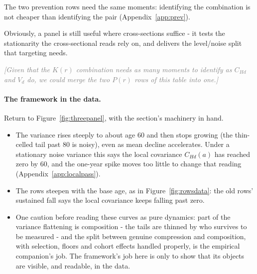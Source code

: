 \documentclass[11pt]{article}
\theoremstyle{remark}
\newcommand{\jnote}[1]{\textcolor{gray}{\textit{[#1]}}}
\newcommand{\Cov}{\mathrm{Cov}}
\begin{document}
The two prevention rows need the same moments: identifying the combination is not cheaper than identifying the pair (Appendix~\ref{app:prev}).

Obviously, a panel is still useful where cross-sections suffice - it tests the stationarity the cross-sectional reads rely on, and delivers the level/noise split that targeting needs.

\jnote{Given that the $K(r)$ combination needs as many moments to identify as $C_{Hd}$ and $V_d$ do, we could merge the two $P(r)$ rows of this table into one.}

\paragraph{The framework in the data.}
Return to Figure~\ref{fig:threepanel}, with the section's machinery in hand.

\begin{itemize}
\item The variance rises steeply to about age 60 and then stops growing (the thin-celled tail past 80 is noisy), even as mean decline accelerates.
Under a stationary noise variance this says the local covariance $C_{Hd}(a)$ has reached zero by 60, and the one-year spike moves too little to change that reading (Appendix~\ref{app:localpass}).
\item The rows steepen with the base age, as in Figure~\ref{fig:rowsdata}: the old rows' sustained fall says the local covariance keeps falling past zero.
\item One caution before reading these curves as pure dynamics: part of the variance flattening is composition - the tails are thinned by who survives to be measured - and the split between genuine compression and composition, with selection, floors and cohort effects handled properly, is the empirical companion's job.
The framework's job here is only to show that its objects are visible, and readable, in the data.
\end{itemize}
%
%
\end{document}
